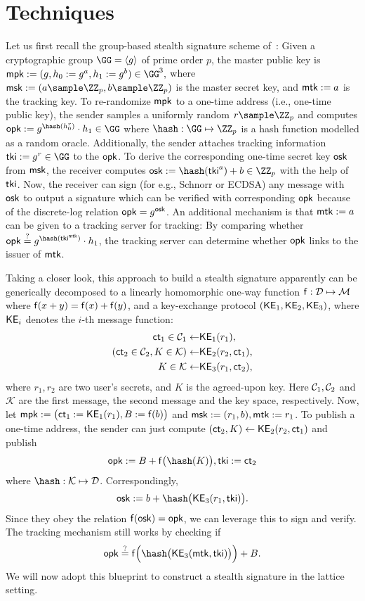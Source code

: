 \fi

\section{Techniques}
Let us first recall the group-based stealth signature scheme of~\cite{stealth2}: Given a cryptographic group $\GG=\langle g\rangle$ of prime order $p$, the master public key is $\mpk:=(g,h_0:=g^a,h_1:=g^b)\in\GG^3,$ where $\msk := (a\sample\ZZ_p,b\sample\ZZ_p)$ is the master secret key, and $\mathsf{mtk} := a$ is the tracking key. To re-randomize $\mathsf{mpk}$ to a one-time address (i.e., one-time public key), the sender samples a uniformly random $r\sample\ZZ_p$ and computes $\opk:=g^{\hash(h_0^r)}\cdot h_1\in\GG$ where $\hash:\GG\mapsto\ZZ_p$ is a hash function modelled as a random oracle. Additionally, the sender attaches tracking information $\tki:=g^r\in\GG$ to the $\mathsf{opk}$. To derive the corresponding one-time secret key $\mathsf{osk}$ from $\mathsf{msk}$, the receiver computes $\osk:=\hash(\tki^a)+b\in\ZZ_p$ with the help of $\mathsf{tki}$. Now, the receiver can sign (for e.g., Schnorr or ECDSA) any message with $\mathsf{osk}$ to output a signature which can be verified with corresponding $\mathsf{opk}$ because of the discrete-log relation $\mathsf{opk}=g^{\mathsf{osk}}$. An additional mechanism is that $\mathsf{mtk}:=a$ can be given to a tracking server for tracking: By comparing whether $\opk\eqornot g^{\hash(\tki^\mtk)}\cdot h_1$, the tracking server can determine whether $\mathsf{opk}$ links to the issuer of $\mathsf{mtk}$.

Taking a closer look, this approach to build a stealth signature apparently can be generically decomposed to a linearly homomorphic one-way function $\mathsf{f}:\mathcal{D}\mapsto\mathcal{M}$ where $\mathsf{f}(x+y)=\mathsf{f}(x)+\mathsf{f}(y)$, and a key-exchange protocol $(\mathsf{KE}_1,\mathsf{KE}_2,\mathsf{KE}_3)$, where $\mathsf{KE}_i$ denotes the $i$-th message function: 
\begin{align*}
    \mathsf{ct}_1\in\mathcal{C}_1\gets & \mathsf{KE}_1(r_1),\\
    (\mathsf{ct}_2\in\mathcal{C}_2,K\in\mathcal{K})\gets & \mathsf{KE}_2(r_2,\mathsf{ct}_1),\\
    K\in\mathcal{K}\gets & \mathsf{KE}_3(r_1,\mathsf{ct}_2),
\end{align*}
where $r_1,r_2$ are two user's secrets, and $K$ is the agreed-upon key. Here $\mathcal{C}_1, \mathcal{C}_2$ and $\mathcal{K}$ are the first message, the second message and the key space, respectively. Now, let $\mathsf{mpk}:=\big(\mathsf{ct}_1:=\mathsf{KE}_1(r_1), B:=\mathsf{f}(b)\big)$ and $\mathsf{msk}:=(r_1,b),\mathsf{mtk}:=r_1$. To publish a one-time address, the sender can just compute $(\mathsf{ct}_2,K)\gets \mathsf{KE}_2(r_2,\mathsf{ct}_1)$ and publish $$\opk:= B + \fs\big(\hash(K)\big), \tki:=\ct_2$$ where $\hash:\Kc\mapsto\Dc$. Correspondingly, $$\osk:=b+\hash\big(\ke_3(r_1,\tki)\big).$$
Since they obey the relation $\mathsf{f}(\mathsf{osk})=\mathsf{opk}$, we can leverage this to sign and verify. The tracking mechanism still works by checking if $$\opk\eqornot\fs\Big(\hash\big(\ke_3(\mtk,\tki)\big)\Big)+B.$$
We will now adopt this blueprint to construct a stealth signature in the lattice setting.


